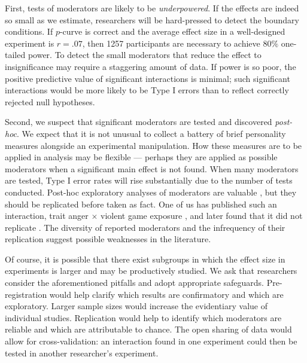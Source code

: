 \documentclass[man]{apa6}
\begin{document}
First, tests of moderators are likely to be {\em underpowered}. If the effects are indeed so small as we estimate, researchers will be hard-pressed to detect the boundary conditions. If $p$-curve is correct and the average effect size in a well-designed experiment is $r = .07$, then 1257 participants are necessary to achieve $80\%$ one-tailed power. To detect the small moderators that reduce the effect to insignificance may require a staggering amount of data. If power is so poor, the positive predictive value of significant interactions is minimal; such significant interactions would be more likely to be Type I errors than to reflect correctly rejected null hypotheses. 

Second, we suspect that significant moderators are tested and discovered {\em post-hoc}. We expect that it is not unusual to collect a battery of brief personality measures alongside an experimental manipulation. How these measures are to be applied in analysis may be flexible --- perhaps they are applied as possible moderators when a significant main effect is not found. When many moderators are tested, Type I error rates will rise substantially due to the number of tests conducted. Post-hoc exploratory analyses of moderators are valuable \citep[indeed, we have presented them ourselves in the past,][]{Engelhardt:etal:2015a}, but they should be replicated before taken as fact. %
One of us has published such an interaction, trait anger $\times$ violent game exposure \citep{Engelhardt:etal:2011a}, and later found that it did not replicate \citep{Engelhardt:etal:inprep}. The diversity of reported moderators and the infrequency of their replication suggest possible weaknesses in the literature. 

Of course, it is possible that there exist subgroups in which the effect size in experiments is larger and may be productively studied. We ask that researchers consider the aforementioned pitfalls and adopt appropriate safeguards. Pre-registration would help clarify which results are confirmatory and which are exploratory. Larger sample sizes would increase the evidentiary value of individual studies. Replication would help to identify which moderators are reliable and which are attributable to chance. The open sharing of data would allow for cross-validation: an interaction found in one experiment could then be tested in another researcher's experiment.
\end{document}
